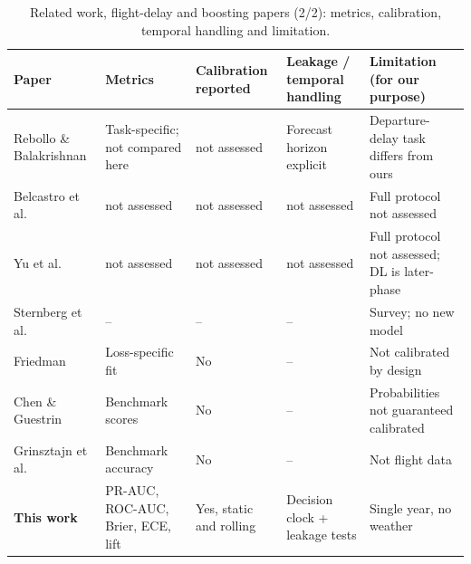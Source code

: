 \documentclass[conference]{IEEEtran}
\newcommand{\tabsize}{\footnotesize}
\begin{document}
\begin{table}[!t]
\caption[Related work: flight-delay and boosting evaluation.]{Related work, flight-delay and boosting papers (2/2): metrics, calibration, temporal handling and limitation.}
\label{tab:rw1b}
\centering\tabsize
\begin{tabular}{@{}P{2.6cm}P{2.9cm}P{1.9cm}P{3.1cm}P{4.0cm}@{}}
\toprule
Paper & Metrics & Calibration reported & Leakage / temporal handling & Limitation (for our purpose)\\
\midrule
Rebollo \& Balakrishnan & Task-specific; not compared here & not assessed & Forecast horizon explicit & Departure-delay task differs from ours\\
Belcastro et al. & not assessed & not assessed & not assessed & Full protocol not assessed\\
Yu et al. & not assessed & not assessed & not assessed & Full protocol not assessed; DL is later-phase\\
Sternberg et al. & -- & -- & -- & Survey; no new model\\
Friedman & Loss-specific fit & No & -- & Not calibrated by design\\
Chen \& Guestrin & Benchmark scores & No & -- & Probabilities not guaranteed calibrated\\
Grinsztajn et al. & Benchmark accuracy & No & -- & Not flight data\\
\textbf{This work} & PR-AUC, ROC-AUC, Brier, ECE, lift & Yes, static and rolling & Decision clock + leakage tests & Single year, no weather\\
\bottomrule
\end{tabular}
\end{table}
\end{document}
